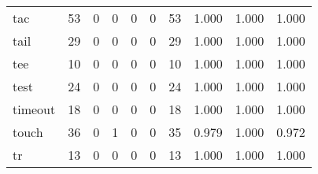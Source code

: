 \begin{longtable}{lp{1.3cm}p{1.3cm}p{1.3cm}p{1.3cm}p{1.3cm}p{1.3cm}p{1.3cm}p{1.3cm}p{1.3cm}}
tac       &                     53 &                                             0 &                                            0 &                                           0 &                                            0 &                                         53 &                                1.000 &                                  1.000 &                                1.000 \\
tail      &                     29 &                                             0 &                                            0 &                                           0 &                                            0 &                                         29 &                                1.000 &                                  1.000 &                                1.000 \\
tee       &                     10 &                                             0 &                                            0 &                                           0 &                                            0 &                                         10 &                                1.000 &                                  1.000 &                                1.000 \\
test      &                     24 &                                             0 &                                            0 &                                           0 &                                            0 &                                         24 &                                1.000 &                                  1.000 &                                1.000 \\
timeout   &                     18 &                                             0 &                                            0 &                                           0 &                                            0 &                                         18 &                                1.000 &                                  1.000 &                                1.000 \\
touch     &                     36 &                                             0 &                                            1 &                                           0 &                                            0 &                                         35 &                                0.979 &                                  1.000 &                                0.972 \\
tr        &                     13 &                                             0 &                                            0 &                                           0 &                                            0 &                                         13 &                                1.000 &                                  1.000 &                                1.000 \\

\end{longtable}
